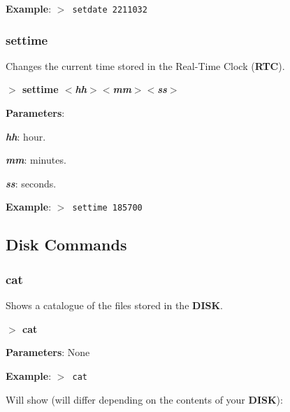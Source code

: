         \textbf{Example}: \texttt{$>$ setdate 2211032}

        \subsubsection{{settime}}
        Changes the current time stored in the Real-Time Clock (\textbf{RTC}).

        \hspace{1.9cm}\textbf{$>$ settime \textit{$<$hh$>$$<$mm$>$$<$ss$>$}}

        \textbf{Parameters}:

        \hspace{1cm}\textbf{\textit{hh}}: hour.

        \hspace{1cm}\textbf{\textit{mm}}: minutes.

        \hspace{1cm}\textbf{\textit{ss}}: seconds.

        \textbf{Example}: \texttt{$>$ settime 185700}

    \subsection{Disk Commands}\label{dskcmds}
        \subsubsection{{cat}}
        \label{cmd:cat}

        Shows a catalogue of the files stored in the \textbf{DISK}.

        \hspace{1.9cm}\textbf{$>$ cat}

        \textbf{Parameters}: None

        \textbf{Example}: \texttt{$>$ cat}

        Will show (will differ depending on the contents of your \textbf{DISK}):


